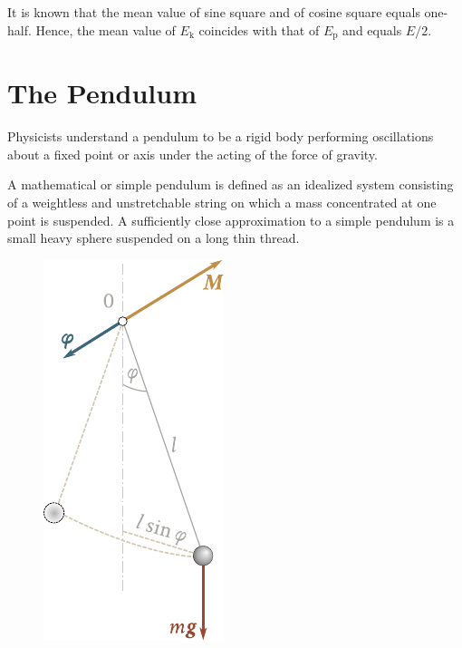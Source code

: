 It is known that the mean value of sine square and of cosine square equals one-half. Hence, the mean value of $E_{\text{k}}$ coincides with that of $E_{\text{p}}$ and equals $E/2$.

\section{The Pendulum}\label{sec:7_6}

Physicists understand a pendulum to be a rigid body performing oscillations about a fixed point or axis under the acting of the force of gravity.

A mathematical or simple pendulum is defined as an idealized system consisting of a weightless and unstretchable string on which a mass concentrated at one point is suspended. A sufficiently close approximation to a simple pendulum is a small heavy sphere suspended on a long thin thread.

\begin{figure}[t]
	\begin{center}
		\includegraphics[scale=0.95]{figures/ch_07/fig_7_7.pdf}
		\caption[]{}
		\label{fig:7_7}
	\end{center}
	\vspace{-0.7cm}
\end{figure}

